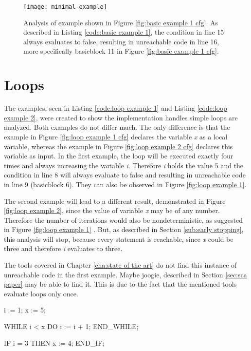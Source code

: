 \begin{figure}[h!]
	\centering
	\texttt{[image: minimal-example]}
	\caption{Analysis of example shown in Figure \ref{fig:basic example 1 cfg}. As described in Listing \ref{code:basic example 1}, the condition in line 15 always evaluates to false, resulting in unreachable code in line 16, more specifically basicblock 11 in Figure \ref{fig:basic example 1 cfg}. }
	\label{fig:basic example 1}
\end{figure}

\section{Loops}
\label{sec:loops}
The examples, seen in Listing \ref{code:loop example 1} and Listing \ref{code:loop example 2}, were created to show the implementation handles simple loops are analyzed. Both examples do not differ much. The only difference is that the example in Figure \ref{fig:loop example 1 cfg} declares the variable \emph{x} as a local variable, whereas the example in Figure \ref{fig:loop example 2 cfg} declares this variable as input. 
In the first example, the loop will be executed exactly four times and always increasing the variable \emph{i}. Therefore \emph{i} holds the value 5 and the condition in line 8 will always evaluate to false and resulting in unreachable code in line 9 (basicblock 6). They can also be observed in Figure \ref{fig:loop example 1}.


The second example will lead to a different result, demonstrated in Figure \ref{fig:loop example 2}, since the value of variable \emph{x} may be of any number. Therefore the number of iterations would also be nondeterministic, as suggested in Figure \ref{fig:loop example 1} . But, as described in Section \ref{sub:early stopping}, this analysis will stop, because every statement is reachable, since \emph{x} could be three and therefore \emph{i} evaluates to three. 


The tools covered in Chapter \ref{cha:state of the art} do not find this instance of unreachable code in the first example. Maybe joogie, described in Section \ref{sec:sca paper} may be able to find it. This is due to the fact that the mentioned tools evaluate loops only once.

\begin{program}[h!]
		\begin{GenericCode}
i := 1;
x := 5;
		
WHILE i < x DO
	i := i + 1;
END_WHILE;
		
IF i = 3 THEN
	x := 4;
END_IF;	\end{GenericCode}
\centering
\caption{A simple loop that increments a number. Since \emph{i} is dependent on the iterations, which are limited by and will be equal to \emph{x}, in this case 5, the condition in line 8 will never evaluate true.}
\label{code:loop example 1}
\end{program}

